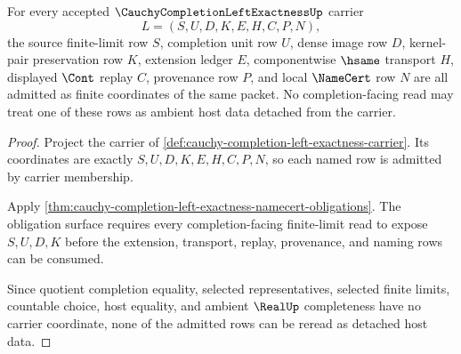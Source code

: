 \begin{theorem}
\label{thm:cauchy-completion-left-exactness-carrier-admission}
For every accepted $\CauchyCompletionLeftExactnessUp$ carrier
$$
L=(S,U,D,K,E,H,C,P,N),
$$
the source finite-limit row $S$, completion unit row $U$, dense image row $D$, kernel-pair preservation row $K$, extension ledger $E$, componentwise $\hsame$ transport $H$, displayed $\Cont$ replay $C$, provenance row $P$, and local $\NameCert$ row $N$ are all admitted as finite coordinates of the same packet. No completion-facing read may treat one of these rows as ambient host data detached from the carrier.
\end{theorem}
\begin{proof}
Project the carrier of \autoref{def:cauchy-completion-left-exactness-carrier}. Its coordinates are exactly $S,U,D,K,E,H,C,P,N$, so each named row is admitted by carrier membership.

Apply \autoref{thm:cauchy-completion-left-exactness-namecert-obligations}. The obligation surface requires every completion-facing finite-limit read to expose $S,U,D,K$ before the extension, transport, replay, provenance, and naming rows can be consumed.

Since quotient completion equality, selected representatives, selected finite limits, countable choice, host equality, and ambient $\RealUp$ completeness have no carrier coordinate, none of the admitted rows can be reread as detached host data.
\end{proof}

